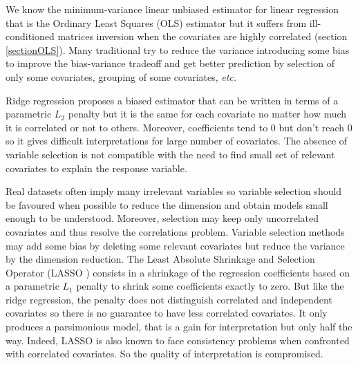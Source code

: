 \documentclass[11pt,a4paper]{article}
\begin{document}
	We know the minimum-variance linear unbiased estimator for linear regression that is the Ordinary Least Squares (\textsc{OLS}) estimator but it suffers from ill-conditioned matrices inversion when the covariates are highly correlated (section \ref{sectionOLS}). 
	Many traditional try to reduce the variance introducing some bias to improve the bias-variance tradeoff and get better prediction by selection of only some covariates, grouping of some covariates, {\it etc.}



	 Ridge regression \cite{marquardt1975ridge} proposes a biased estimator that can be written in terms of a parametric $L_2$ penalty but
	it is the same for each covariate no matter how much it is correlated or not to others.%
	Moreover, coefficients tend to 0 but don't reach 0 so it gives difficult interpretations for large number of covariates. The absence of variable selection is not compatible with the need to find small set of relevant covariates to explain the response variable. 
	
	Real datasets often imply many irrelevant variables so variable selection should be favoured when possible to reduce the dimension and obtain models small enough to be understood. Moreover, selection may keep only uncorrelated covariates and thus resolve the correlations problem.	Variable selection methods may add some bias by deleting some relevant covariates but reduce the variance by the dimension reduction.
	The Least Absolute Shrinkage and Selection Operator (\textsc{LASSO} \cite{tibshirani1996regression}) consists in a shrinkage of the regression coefficients based on a parametric $L_1$ penalty to shrink some coefficients exactly to zero.
But like the ridge regression, the penalty does not distinguish correlated and independent covariates so there is no guarantee to have less correlated covariates. It only produces a parsimonious model, that is a gain for interpretation but only half the way.
	 Indeed, \textsc{LASSO} is also known to face consistency problems \cite{Zhao2006MSC} when confronted with correlated covariates. So the quality of interpretation is compromised.
	 \\
	 
\end{document}
